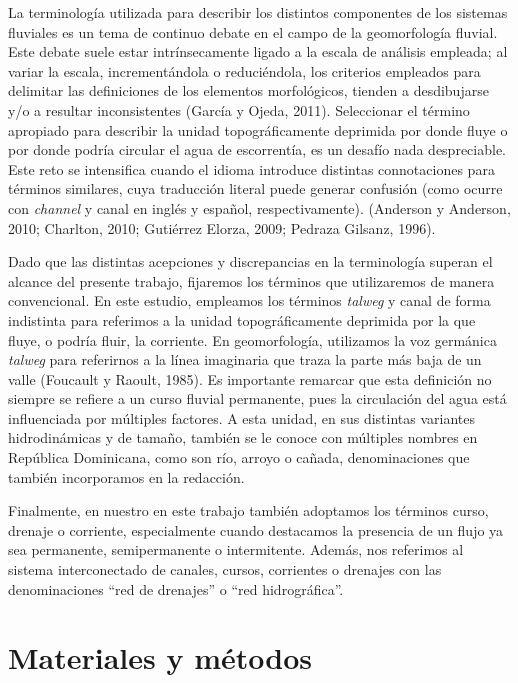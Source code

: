 \documentclass[spanish]{article}
\begin{document}
La terminología utilizada para describir los distintos componentes de
los sistemas fluviales es un tema de continuo debate en el campo de la
geomorfología fluvial. Este debate suele estar intrínsecamente ligado a
la escala de análisis empleada; al variar la escala, incrementándola o
reduciéndola, los criterios empleados para delimitar las definiciones de
los elementos morfológicos, tienden a desdibujarse y/o a resultar
inconsistentes (García y Ojeda, 2011). Seleccionar el término apropiado
para describir la unidad topográficamente deprimida por donde fluye o
por donde podría circular el agua de escorrentía, es un desafío nada
despreciable. Este reto se intensifica cuando el idioma introduce
distintas connotaciones para términos similares, cuya traducción literal
puede generar confusión (como ocurre con \emph{channel} y canal en
inglés y español, respectivamente). (Anderson y Anderson, 2010;
Charlton, 2010; Gutiérrez Elorza, 2009; Pedraza Gilsanz, 1996).

Dado que las distintas acepciones y discrepancias en la terminología
superan el alcance del presente trabajo, fijaremos los términos que
utilizaremos de manera convencional. En este estudio, empleamos los
términos \emph{talweg} y canal de forma indistinta para referimos a la
unidad topográficamente deprimida por la que fluye, o podría fluir, la
corriente. En geomorfología, utilizamos la voz germánica \emph{talweg}
para referirnos a la línea imaginaria que traza la parte más baja de un
valle (Foucault y Raoult, 1985). Es importante remarcar que esta
definición no siempre se refiere a un curso fluvial permanente, pues la
circulación del agua está influenciada por múltiples factores. A esta
unidad, en sus distintas variantes hidrodinámicas y de tamaño, también
se le conoce con múltiples nombres en República Dominicana, como son
río, arroyo o cañada, denominaciones que también incorporamos en la
redacción.

Finalmente, en nuestro en este trabajo también adoptamos los términos
curso, drenaje o corriente, especialmente cuando destacamos la presencia
de un flujo ya sea permanente, semipermanente o intermitente. Además,
nos referimos al sistema interconectado de canales, cursos, corrientes o
drenajes con las denominaciones ``red de drenajes'' o ``red
hidrográfica''.

\hypertarget{materiales-y-muxe9todos}{%
\section{Materiales y métodos}\label{materiales-y-muxe9todos}}
\end{document}
